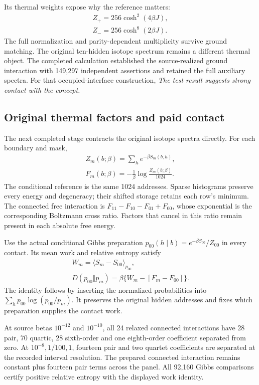 Its thermal weights expose why the reference matters:
\[
\begin{gathered}
Z_+=256\cosh^2(4\beta J),\\
 Z_-=256\cosh^8(2\beta J).
\end{gathered}
\]
The full normalization and parity-dependent multiplicity survive ground
matching. The original ten-hidden isotope spectrum remains a different
thermal object. The completed calculation established the source-realized
ground interaction with 149,297 independent assertions and retained the
full auxiliary spectra. For that occupied-interface construction,
\emph{The test result suggests strong contact with the concept.}

\subsection{Original thermal factors and paid contact}

The next completed stage contracts the original isotope spectra directly.
For each boundary and mask,
\[
\begin{gathered}
Z_m(b;\beta)=\sum_h e^{-\beta S_m(b,h)},\\
 F_m(b;\beta)=-\frac1\beta\log\frac{Z_m(b;\beta)}{1024}.
\end{gathered}
\]
The conditional reference is the same 1024 addresses. Sparse histograms
preserve every energy and degeneracy; their shifted storage retains each
row's minimum. The connected free interaction is
\(F_{11}-F_{10}-F_{01}+F_{00}\), whose exponential is the corresponding
Boltzmann cross ratio. Factors that cancel in this ratio remain present
in each absolute free energy.

Use the actual conditional Gibbs preparation
\(p_{00}(h\mid b)=e^{-\beta S_{00}}/Z_{00}\) in every contact. Its mean work
and relative entropy satisfy
\[
\begin{gathered}
W_m=\langle S_m-S_{00}\rangle_{p_{00}},\\
 D(p_{00}\Vert p_m)
   =\beta\{W_m-[F_m-F_{00}]\}.
\end{gathered}
\]
The identity follows by inserting the normalized probabilities into
\(\sum_h p_{00}\log(p_{00}/p_m)\). It preserves the original hidden addresses
and fixes which preparation supplies the contact work.

At source betas \(10^{-12}\) and \(10^{-10}\), all 24 relaxed connected
interactions have 28 pair, 70 quartic, 28 sixth-order and one eighth-order
coefficient separated from zero. At \(10^{-8},1/100,1\), fourteen pair and
two quartet coefficients are separated at the recorded interval resolution.
The prepared connected interaction remains constant plus fourteen pair
terms across the panel. All 92,160 Gibbs comparisons certify positive
relative entropy with the displayed work identity.

